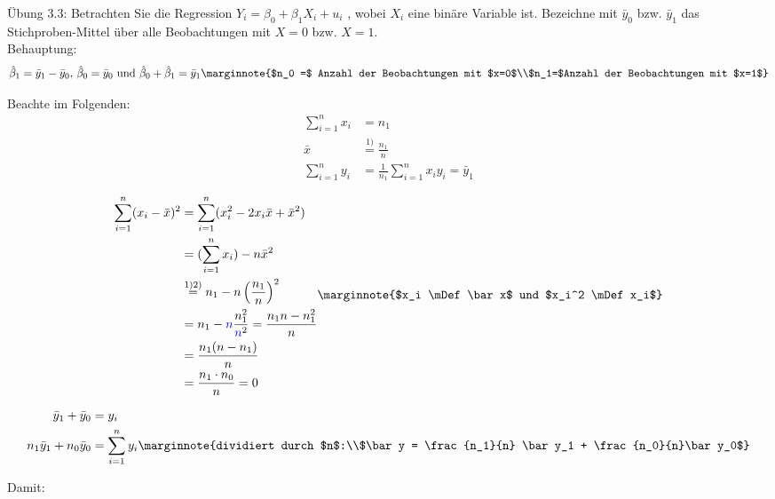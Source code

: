 Übung 3.3: Betrachten Sie die Regression $Y_i = \beta_0 + \beta_1 X_i + u_i$ , wobei $X_i$
eine binäre Variable ist. Bezeichne mit $\bar y_0$ bzw. $\bar y_1$ das Stichproben-Mittel
über alle Beobachtungen mit $X = 0$ bzw. $X = 1$.\\

Behauptung:
\begin{align*}
\hat\beta_1 = \bar y_1 - \bar y_0,\, \hat\beta_0 = \bar y_0 \text{ und }
\hat\beta_0 +\hat\beta_1&=\bar y_1\marginnote{$n_0 =$ Anzahl der Beobachtungen mit $x=0$\\$n_1=$Anzahl der Beobachtungen mit $x=1$}\\
\end{align*}

Beachte im Folgenden:
\begin{align}
	\sum^{n}_{i=1} x_i &= n_1\\
	\bar x &\stackrel{1)}{=} \frac{n_1}{n}\\
	\sum^{n}_{i=1} y_i&=\frac{1}{n_1} \sum^{n}_{i=1} x_i y_i=\bar y_1
\end{align}

\begin{align}
	\begin{split}
		\sum^{n}_{i=1} (x_i - \bar x)^2 &= \sum^{n}_{i=1} (x_i^2 - 2x_i \bar x + \bar x^2)\\
					&=(\sum^{n}_{i=1} x_i) - n\bar x^2 \\
				 &\stackrel{1)2)}{=}n_1 -n \left( \frac{n_1}{n} \right)^2\\
		   &=n_1 - \textcolor{blue}{n}\frac{n_1^2}{\textcolor{blue}{n}^2}=\frac{n_1 n - n_1^2}{n}\\
	&= \frac{n_1(n-n_1)}{n}\\
 &=\frac{n_1\cdot n_0}{n}=0\\
	\end{split}\marginnote{$x_i \mDef \bar x$ und $x_i^2 \mDef x_i$}
\end{align}

\begin{align}
	\begin{split}
		\bar y_1 +  \bar y_0 &=  y_i\\
		n_1 \bar y_1 + n_0 \bar y_0 &= \sum^{n}_{i=1} y_i
		\marginnote{dividiert durch $n$:\\$\bar y = \frac{n_1}{n} \bar y_1 +
		\frac{n_0}{n}\bar y_0$}
	\end{split}
\end{align}

Damit:

